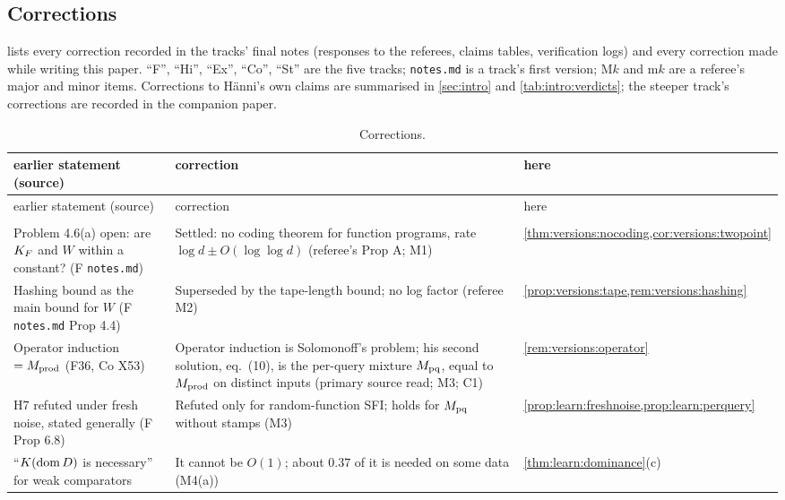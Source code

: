 \subsection{Corrections}\label{app:verification:corrections}

 lists every correction recorded in the tracks' final notes (responses to the referees, claims tables, verification logs) and every correction made while writing this paper. ``F'', ``Hi'', ``Ex'', ``Co'', ``St'' are the five tracks; \texttt{notes.md} is a track's first version; M$k$ and m$k$ are a referee's major and minor items. Corrections to H\"anni's own claims are summarised in \cref{sec:intro} and \cref{tab:intro:verdicts}; the steeper track's corrections are recorded in the companion paper.

{\crefabbrev\footnotesize
\renewcommand{\arraystretch}{1.12}
\begin{longtable}{@{}>{\raggedright\arraybackslash}p{5.1cm}>{\raggedright\arraybackslash}p{7.6cm}>{\raggedright\arraybackslash}p{2.6cm}@{}}
\caption{Corrections.}\label{tab:verification:corrections}\\
\toprule
earlier statement (source) & correction & here\\
\midrule
\endfirsthead
\toprule
earlier statement (source) & correction & here\\
\midrule
\endhead
\bottomrule
\endfoot
\multicolumn{3}{@{}l}{\emph{Foundations}}\\
Problem 4.6(a) open: are $K_{F}$ and $W$ within a constant? (F \texttt{notes.md}) & Settled: no coding theorem for function programs, rate $\log d\pm O(\log\log d)$ (referee's Prop A; M1) & \cref{thm:versions:nocoding,cor:versions:twopoint}\\
Hashing bound as the main bound for $W$ (F \texttt{notes.md} Prop 4.4) & Superseded by the tape-length bound; no log factor (referee M2) & \cref{prop:versions:tape,rem:versions:hashing}\\
Operator induction $=M_{\mathrm{prod}}$ (F36, Co X53) & Operator induction is Solomonoff's problem; his second solution, eq.~(10), is the per-query mixture $M_{\mathrm{pq}}$, equal to $M_{\mathrm{prod}}$ on distinct inputs (primary source read; M3; C1) & \cref{rem:versions:operator}\\
H7 refuted under fresh noise, stated generally (F Prop 6.8) & Refuted only for random-function SFI; holds for $M_{\mathrm{pq}}$ without stamps (M3) & \cref{prop:learn:freshnoise,prop:learn:perquery}\\
``$K(\operatorname{dom} D)$ is necessary'' for weak comparators & It cannot be $O(1)$; about $0.37$ of it is needed on some data (M4(a)) & \cref{thm:learn:dominance}(c)\\

\end{longtable}}

